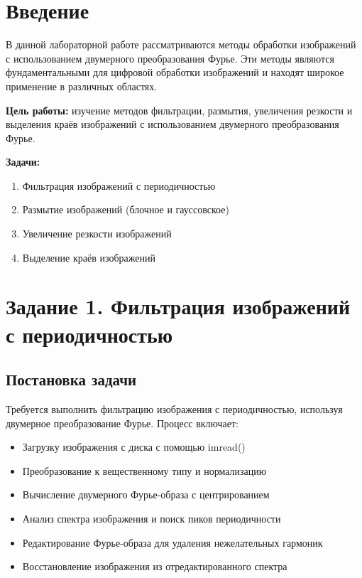 \section*{Введение}

В данной лабораторной работе рассматриваются методы обработки изображений с использованием двумерного преобразования Фурье. Эти методы являются фундаментальными для цифровой обработки изображений и находят широкое применение в различных областях.

\textbf{Цель работы:} изучение методов фильтрации, размытия, увеличения резкости и выделения краёв изображений с использованием двумерного преобразования Фурье.

\textbf{Задачи:}
\begin{enumerate}
    \item Фильтрация изображений с периодичностью
    \item Размытие изображений (блочное и гауссовское)
    \item Увеличение резкости изображений
    \item Выделение краёв изображений
\end{enumerate}

\section*{Задание 1. Фильтрация изображений с периодичностью}

\subsection*{Постановка задачи}

Требуется выполнить фильтрацию изображения с периодичностью, используя двумерное преобразование Фурье. Процесс включает:
\begin{itemize}
    \item Загрузку изображения с диска с помощью imread()
    \item Преобразование к вещественному типу и нормализацию
    \item Вычисление двумерного Фурье-образа с центрированием
    \item Анализ спектра изображения и поиск пиков периодичности
    \item Редактирование Фурье-образа для удаления нежелательных гармоник
    \item Восстановление изображения из отредактированного спектра
\end{itemize}

